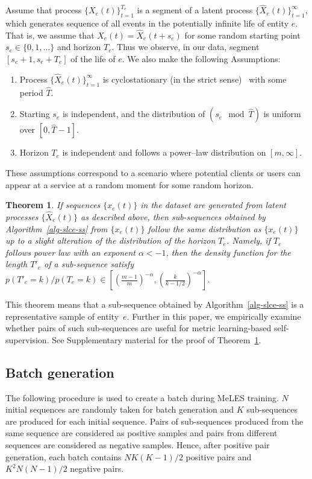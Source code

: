 \documentclass{article}
\newtheorem{thm}{Theorem}
\begin{document}
Assume that process $\{X_e(t)\}_{t=1}^{T_e}$ is a segment of a latent process $\{\widehat{X}_e(t)\}_{t=1}^{\infty}$, which generates sequence of all events in the potentially infinite life of entity $e$. That is, we assume that $X_e(t)=\widehat{X}_e(t+s_e)$ for some random starting point $s_e\in \{0,1,\ldots\}$ and horizon $T_e$. Thus we observe, in our data, segment $[s_e+1,s_e+T_e]$ of the life of $e$. We also make the following Assumptions:
\begin{enumerate}
    \item Process $\{\widehat{X}_e(t)\}_{t=1}^{\infty}$ is cyclostationary (in the strict sense)~\cite{Gardner2006Cyclostationarity} with some period $\widehat{T}$.
    \item Starting $s_e$ is independent, and the distribution of $(s_e \mod \widehat{T})$ is uniform over $[0,\widehat{T}-1]$.
    \item Horizon $T_e$ is independent and follows a power--law distribution on $[m,\infty]$.
\end{enumerate}
These assumptions correspond to a scenario where potential clients or users can appear at a service at a random moment for some random horizon.    %
\begin{thm}\label{thm:distribution}
If sequences $\{x_e(t)\}$ in the dataset are generated from latent processes $\{\widehat{X}_e(t)\}$ as described above, then sub-sequences obtained by Algorithm~\ref{alg-slce-ss} from $\{x_e(t)\}$ follow the same distribution as $\{x_e(t)\}$ up to a slight alteration of the distribution of the horizon $T_e$. Namely, if $T_e$ follows power law with an exponent $\alpha <-1$, then the density function for the length $T'_e$ of a sub-sequence satisfy $p(T'_e=k)/p(T_e=k)\in [(\frac{m-1}{m})^{-\alpha},(\frac{k}{k-1/2})^{-\alpha}]$.
\end{thm}
This theorem means that a sub-sequence obtained by Algorithm~\ref{alg-slce-ss} is a representative sample of entity~$e$. Further in this paper, we empirically examine whether pairs of such sub-sequences are useful for metric learning-based self-supervision. See Supplementary material for the proof of Theorem~\ref{thm:distribution}.

\subsection{Batch generation}

The following procedure is used to create a batch during MeLES training. $N$ initial sequences are randomly taken for batch generation and $K$ sub-sequences are produced for each initial sequence. Pairs of sub-sequences produced from the same sequence are considered as positive samples and pairs from different sequences are considered as negative samples. Hence, after positive pair generation, each batch contains %
$NK(K-1)/2$ positive pairs and $K^2N(N - 1)/2$ negative pairs.
\end{document}
